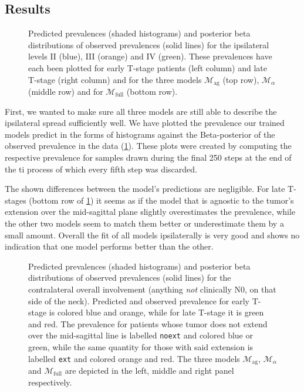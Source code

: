 \documentclass[\relativeRoot/main.tex]{subfiles}
\begin{document}
\subsection{Results}
\label{subsec:bilateral:model_comp:results}

\begin{figure}
    \def\svgwidth{1.0\textwidth}
    
    \caption[
        Comparison of ipsilateral prevalences
    ]{
        Predicted prevalences (shaded histograms) and posterior beta distributions of observed prevalences (solid lines) for the ipsilateral levels II (blue), III (orange) and IV (green). These prevalences have each been plotted for early T-stage patients (left column) and late T-stage (right column) and for the three models $\mathcal{M}_\text{ag}$ (top row), $\mathcal{M}_\alpha$ (middle row) and for $\mathcal{M}_\text{full}$ (bottom row).
    }
    \label{fig:bilateral:model_comp:ipsi}
\end{figure}

First, we wanted to make sure all three models are still able to describe the ipsilateral spread sufficiently well. We have plotted the prevalence our trained models predict in the forms of histograms against the Beta-posterior of the observed prevalence in the data (\cref{fig:bilateral:model_comp:ipsi}). These plots were created by computing the respective prevalence for samples drawn during the final 250 steps at the end of the \gls{ti} process of which every fifth step was discarded.

The shown differences between the model's predictions are negligible. For late T-stages (bottom row of \cref{fig:bilateral:model_comp:ipsi}) it seems as if the model that is agnostic to the tumor's extension over the mid-sagittal plane slightly overestimates the prevalence, while the other two models seem to match them better or underestimate them by a small amount. Overall the fit of all models ipsilaterally is very good and shows no indication that one model performs better than the other.

\begin{figure}
    \def\svgwidth{1.0\textwidth}
    
    \caption[
        Comparison of contralateral prevalences
    ]{
        Predicted prevalences (shaded histograms) and posterior beta distributions of observed prevalences (solid lines) for the contralateral overall involvement (anything \emph{not} clinically N0, on that side of the neck). Predicted and observed prevalence for early T-stage is colored blue and orange, while for late T-stage it is green and red. The prevalence for patients whose tumor does not extend over the mid-sagittal line is labelled \texttt{noext} and colored blue or green, while the same quantity for those with said extension is labelled \texttt{ext} and colored orange and red. The three models $\mathcal{M}_\text{ag}$, $\mathcal{M}_\alpha$ and $\mathcal{M}_\text{full}$ are depicted in the left, middle and right panel respectively.
    }
    \label{fig:bilateral:model_comp:contra}
\end{figure}
\end{document}
